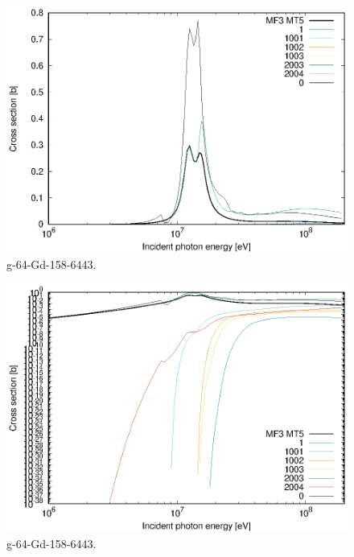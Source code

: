 \begin{figure}
 \includegraphics[width=\linewidth]{eps/g_64-Gd-158_6443.eps}
  \caption{g-64-Gd-158-6443.}
\end{figure}
\begin{figure}
 \includegraphics[width=\linewidth]{eps-log/g_64-Gd-158_6443.eps}
 \caption{g-64-Gd-158-6443.}
\end{figure}
\newpage \clearpage

